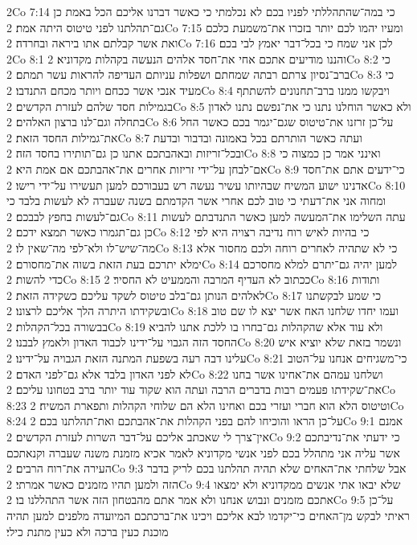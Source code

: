 2Co 7:14  כי במה־שהתהללתי לפניו בכם לא נכלמתי כי כאשר דברנו אליכם הכל באמת כן גם־תהלתנו לפני טיטוס היתה אמת׃
2Co 7:15  ומעיו יהמו לכם יותר בזכרו את־משמעת כלכם ואת אשר קבלתם אתו ביראה ובחרדה׃
2Co 7:16  לכן אני שמח כי בכל־דבר יאמץ לבי בכם׃
2Co 8:1  והננו מודיעים אתכם אחי את־חסד אלהים הנעשה בקהלות מקדוניא׃
2Co 8:2  כי ברב־נסיון צרתם רבתה שמחתם ושפלות עניותם העדיפה להראות עשר תמתם׃
2Co 8:3  כי מעיד אנכי אשר ככחם ויותר מכחם התנדבו׃
2Co 8:4  ויבקשו ממנו ברב־תחנונים להשתתף בגמילות חסד שלהם לעזרת הקדשים׃
2Co 8:5  ולא כאשר הוחלנו נתנו כי את־נפשם נתנו לאדון בתחלה וגם־לנו ברצון האלהים׃
2Co 8:6  על־כן זרזנו את־טיטוס שגם־יגמר בכם כאשר החל את־גמילות החסד הזאת׃
2Co 8:7  ועתה כאשר הותרתם בכל באמונה ובדבור ובדעת ובכל־זריזות ובאהבתכם אתנו כן גם־תותירו בחסד הזה׃
2Co 8:8  ואינני אמר כן כמצוה כי אם־לבחן על־ידי זריזות אחרים את־אהבתכם אם אמת היא׃
2Co 8:9  כי־ידעים אתם את־חסד אדנינו ישוע המשיח שבהיותו עשיר נעשה רש בעבורכם למען תעשירו על־ידי רישו׃
2Co 8:10  ומחוה אני את־דעתי כי טוב לכם אחרי אשר הקדמתם בשנה שעברה לא לעשות בלבד כי גם־לעשות בחפץ לבבכם׃
2Co 8:11  עתה השלימו את־המעשה למען כאשר התנדבתם לעשות כן גם־תגמרו כאשר תמצא ידכם׃
2Co 8:12  כי בהיות לאיש רוח נדיבה רצויה היא לפי מה־שיש־לו ולא־לפי מה־שאין לו׃
2Co 8:13  כי לא שתהיה לאחרים רוחה ולכם מחסור אלא ימלא יתרכם בעת הזאת בשוה את־מחסורם׃
2Co 8:14  למען יהיה גם־יתרם למלא מחסרכם כדי להשות׃
2Co 8:15  ככתוב לא העדיף המרבה והממעיט לא החסיר׃
2Co 8:16  ותודות לאלהים הנותן גם־בלב טיטוס לשקד עליכם כשקידה הזאת׃
2Co 8:17  כי שמע לבקשתנו ובשקידתו היתרה הלך אליכם לרצונו׃
2Co 8:18  ועמו יחדו שלחנו האח אשר יצא לו שם טוב בבשורה בכל־הקהלות׃
2Co 8:19  ולא עוד אלא שהקהלות גם־בחרו בו ללכת אתנו להביא החסד הזה הגבוי על־ידינו לכבוד האדון ולאמץ לבבנו׃
2Co 8:20  ונשמר בזאת שלא יוציא איש עלינו דבה רעה בשפעת המתנה הזאת הגבויה על־ידינו׃
2Co 8:21  כי־משגיחים אנחנו על־הטוב לא לפני האדון בלבד אלא גם־לפני האדם׃
2Co 8:22  ושלחנו עמהם את־אחינו אשר בחנו את־שקידתו פעמים רבות בדברים הרבה ועתה הוא שקוד עוד יותר ברב בטחונו עליכם׃
2Co 8:23  וטיטוס הלא הוא חברי ועזרי בכם ואחינו הלא הם שלוחי הקהלות ותפארת המשיח׃
2Co 8:24  על־כן הראו והוכיחו להם בפני הקהלות את־אהבתכם ואת־תהלתנו בכם׃
2Co 9:1  אמנם אין־צרך לי שאכתב אליכם על־דבר השרות לעזרת הקדשים׃
2Co 9:2  כי ידעתי את־נדיבתכם אשר עליה אני מתהלל בכם לפני אנשי מקדוניא לאמר אכיא מזמנת משנה שעברה וקנאתכם העירה את־רוח הרבים׃
2Co 9:3  אבל שלחתי את־האחים שלא תהיה תהלתנו בכם לריק בדבר הזה ולמען תהיו מזמנים כאשר אמרתי׃
2Co 9:4  שלא יבאו אתי אנשים ממקדוניא ולא ימצאו אתכם מזמנים ונבוש אנחנו ולא אמר אתם מהבטחון הזה אשר התהללנו בו׃
2Co 9:5  על־כן ראיתי לבקש מן־האחים כי־יקדמו לבא אליכם ויכינו את־ברכתכם המיועדה מלפנים למען תהיה מוכנת כעין ברכה ולא כעין מתנת כילי׃
